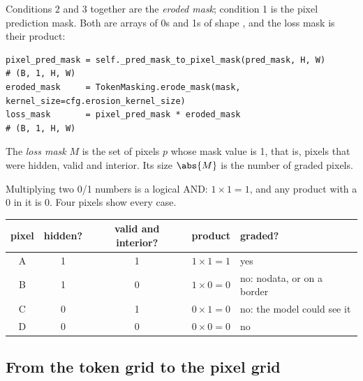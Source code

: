 Conditions 2 and 3 together are the \emph{eroded mask}; condition 1 is the pixel prediction
mask. Both are arrays of 0s and 1s of shape , and the loss mask is their
product:
\begin{lstlisting}
pixel_pred_mask = self._pred_mask_to_pixel_mask(pred_mask, H, W)            # (B, 1, H, W)
eroded_mask     = TokenMasking.erode_mask(mask, kernel_size=cfg.erosion_kernel_size)
loss_mask       = pixel_pred_mask * eroded_mask                             # (B, 1, H, W)
\end{lstlisting}

\begin{definition}
The \emph{loss mask} $M$ is the set of pixels $p$ whose mask value is 1, that is, pixels that
were hidden, valid and interior. Its size $\abs{M}$ is the number of graded pixels.
\end{definition}

Multiplying two 0/1 numbers is a logical AND: $1 \times 1 = 1$, and any product with a 0 in
it is 0. Four pixels show every case.

\begin{center}
\begin{tabular}{ccccl}
\toprule
pixel & hidden? & valid and interior? & product & graded? \\
\midrule
A & 1 & 1 & $1 \times 1 = 1$ & yes \\
B & 1 & 0 & $1 \times 0 = 0$ & no: nodata, or on a border \\
C & 0 & 1 & $0 \times 1 = 0$ & no: the model could see it \\
D & 0 & 0 & $0 \times 0 = 0$ & no \\
\bottomrule
\end{tabular}
\end{center}


\subsection{From the token grid to the pixel grid}

